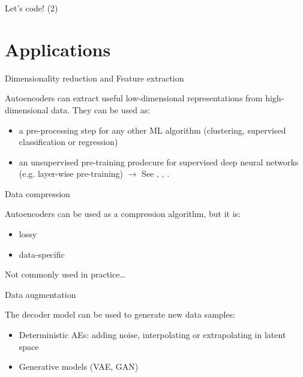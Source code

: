 \documentclass{beamer}
\begin{document}
  \begin{frame}{Let's code! (2)}


    
  \end{frame}

  \section{Applications}

  \begin{frame}{Dimensionality reduction and Feature extraction}

    Autoencoders can extract useful low-dimensional representations from high-dimensional data. They can be used as:

    \begin{itemize}
      \item a pre-processing step for any other ML algorithm (clustering, supervised classification or regression)
      \item an unsupervised pre-training prodecure for supervised deep neural networks (e.g. layer-wise pre-training) $\rightarrow$ See \cite{Hinton2006}, \cite{Erhan2010}, \cite{Vincent2010}.
    \end{itemize}
    
  \end{frame}

  \begin{frame}{Data compression}
    
    Autoencoders can be used as a compression algorithm, but it is:

    \begin{itemize}
      \item lossy
      \item data-specific
    \end{itemize}

    Not commonly used in practice\dots

  \end{frame}  

  \begin{frame}{Data augmentation}

    The decoder model can be used to \alert{generate new data samples}:

    \begin{itemize}
      \item Deterministic AEs: adding noise, interpolating or extrapolating in latent space \cite{Devries2017}
      \item Generative models (VAE, GAN)
    \end{itemize}

  \end{frame}
\end{document}
